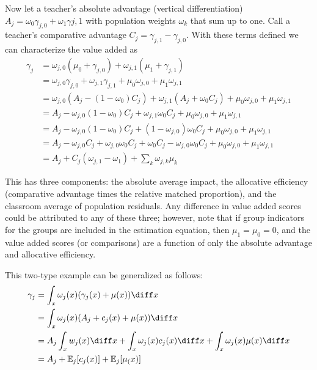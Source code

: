 \documentclass{article}
\theoremstyle{definition}
\theoremstyle{definition}
\theoremstyle{definition}
\theoremstyle{definition}
\begin{document}
    Now let a teacher's absolute advantage (vertical differentiation) $A_j = \omega_{0}\gamma_{j,0} + \omega_{1}\gamma{j,1}$ with population  weights $\omega_{k}$ that sum up to one. Call a teacher's comparative advantage $C_j = \gamma_{j,1} - \gamma_{j,0}$. With these terms defined we can characterize the value added as
    \begin{align*}
        \gamma_j  &= \omega_{j,0}(\mu_0 +\gamma_{j,0}) + \omega_{j,1}(\mu_1 +\gamma_{j,1})  \\
                  & =  \omega_{j,0}\gamma_{j,0} + \omega_{j,1}\gamma_{j,1}   +\mu_0 \omega_{j,0} + \mu_1 \omega_{j,1}  \\
                  & =  \omega_{j,0}(A_j -(1-\omega_{0})C_j) + \omega_{j,1}(A_j +\omega_{0}C_j)  +\mu_0 \omega_{j,0} + \mu_1 \omega_{j,1} \\
                  & =  A_j   - \omega_{j,0} (1-\omega_{0})C_j + \omega_{j,1}\omega_{0}C_j +\mu_0 \omega_{j,0} + \mu_1 \omega_{j,1} \\
                  & =  A_j   - \omega_{j,0} (1-\omega_{0})C_j + (1-\omega_{j,0})\omega_{0}C_j +\mu_0 \omega_{j,0} + \mu_1 \omega_{j,1} \\
                  & =  A_j   - \omega_{j,0} C_j +\omega_{j,0}\omega_{0}C_j + \omega_{0}C_j -\omega_{j,0}\omega_{0}C_j +\mu_0 \omega_{j,0} + \mu_1 \omega_{j,1} \\
                  & =  A_j  + C_j  ( \omega_{j,1} - \omega_{1} ) + \sum_k  \omega_{j,k} \mu_k
    \end{align*}
    
    This has three components: the absolute average impact, the allocative efficiency (comparative advantage times the relative matched proportion), and the classroom average of population residuals. Any difference in value added scores could be attributed to any of these three; however, note that if group indicators for the groups are included in the estimation equation, then $\mu_1 = \mu_0 = 0$, and the value added scores (or comparisons) are a function of only the absolute advantage and allocative efficiency.
    
    This two-type example can be generalized as follows:
    \begin{align*}
        \gamma_j  &= \int_x \omega_j(x)(\gamma_j(x) + \mu(x)) \diff x \\
                  &= \int_x \omega_j(x)(A_j + c_j(x) + \mu(x)) \diff x \\
                  &= A_j \int_x w_j(x) \diff x + \int_x \omega_j(x) c_j(x)\diff x + \int_x \omega_j(x) \mu(x)\diff x \\
                  &= A_j  + \mathbb{E}_j[c_j(x)] + \mathbb{E}_j[\mu_(x)]
    \end{align*}
    
\end{document}
